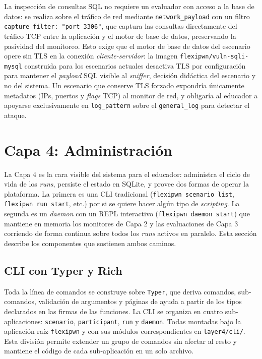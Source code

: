 La inspección de consultas SQL no requiere un evaluador con acceso a la base de
datos: se realiza sobre el tráfico de red mediante \texttt{network\_payload} con
un filtro \texttt{capture\_filter: "port 3306"}, que captura las consultas
directamente del tráfico TCP entre la aplicación y el motor de base de datos,
preservando la pasividad del monitoreo. Esto exige que el motor de base de
datos del escenario opere sin TLS en la conexión \textit{cliente-servidor}: la
imagen \texttt{flexipwn/vuln-sqli-mysql} construida para los escenarios actuales
desactiva TLS por configuración para mantener el \textit{payload} SQL visible al
\textit{sniffer}, decisión didáctica del escenario y no del sistema. Un
escenario que conserve TLS forzado expondría únicamente metadatos (IPs,
puertos y \textit{flags} TCP) al monitor de red, y obligaría al educador a
apoyarse exclusivamente en \texttt{log\_pattern} sobre el
\texttt{general\_log} para detectar el ataque.

\section{Capa 4: Administración}
\label{sec:capa4impl}

La Capa 4 es la cara visible del sistema para el educador: administra el ciclo
de vida de los \textit{runs}, persiste el estado en SQLite, y provee dos formas
de operar la plataforma. La primera es una CLI tradicional (\texttt{flexipwn
scenario list}, \texttt{flexipwn run start}, etc.) por si se quiere hacer algún
tipo de \textit{scripting}. La segunda es un \textit{daemon} con un REPL
interactivo (\texttt{flexipwn daemon start}) que mantiene en memoria los
monitores de Capa 2 y las evaluaciones de Capa 3 corriendo de forma continua
sobre todos los \textit{runs} activos en paralelo. Esta sección describe los
componentes que sostienen ambos caminos.

\subsection{CLI con Typer y Rich}

Toda la línea de comandos se construye sobre \texttt{Typer}, que deriva
comandos, sub-comandos, validación de argumentos y páginas de ayuda a partir de
los tipos declarados en las firmas de las funciones. La CLI se organiza en
cuatro sub-aplicaciones: \texttt{scenario}, \texttt{participant}, \texttt{run} y
\texttt{daemon}. Todas montadas bajo la aplicación raíz \texttt{flexipwn} y con
sus módulos correspondientes en \texttt{layer4/cli/}. Esta división permite
extender un grupo de comandos sin afectar al resto y mantiene el código de cada
sub-aplicación en un solo archivo.

